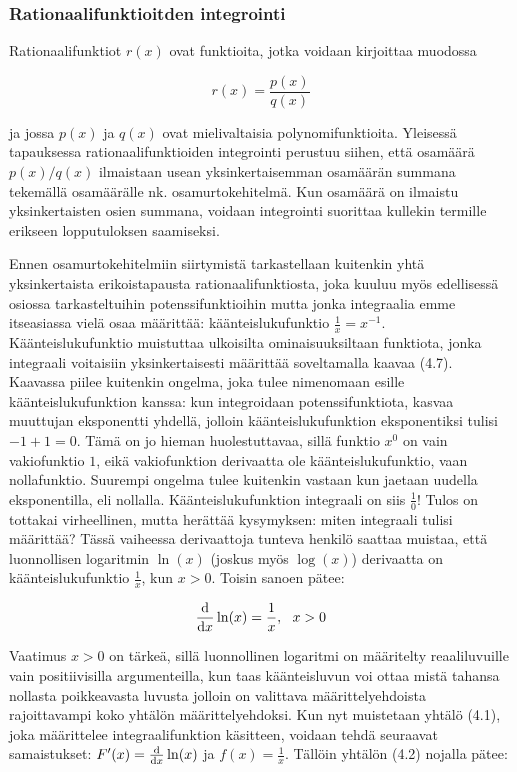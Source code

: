 \documentclass[../integrointiopas.tex]{subfiles}
\begin{document}
	
	
	\subsubsection{Rationaalifunktioitden integrointi}
	
	Rationaalifunktiot $r(x)$ ovat funktioita, jotka voidaan kirjoittaa muodossa
	
	\begin{equation}
		r(x) = \frac{p(x)}{q(x)}
	\end{equation}
	
	ja jossa $p(x)$ ja $q(x)$ ovat mielivaltaisia polynomifunktioita. Yleisessä tapauksessa rationaalifunktioiden integrointi perustuu siihen, että osamäärä $p(x)/q(x)$ ilmaistaan usean yksinkertaisemman osamäärän summana tekemällä osamäärälle nk. osamurtokehitelmä. Kun osamäärä on ilmaistu yksinkertaisten osien summana, voidaan integrointi suorittaa kullekin termille erikseen lopputuloksen saamiseksi. 
	
	Ennen osamurtokehitelmiin siirtymistä tarkastellaan kuitenkin yhtä yksinkertaista erikoistapausta rationaalifunktiosta, joka kuuluu myös edellisessä osiossa tarkasteltuihin potenssifunktioihin mutta jonka integraalia emme itseasiassa vielä osaa määrittää: käänteislukufunktio $\frac{1}{x} = x^{-1}$. Käänteislukufunktio muistuttaa ulkoisilta ominaisuuksiltaan funktiota, jonka integraali voitaisiin yksinkertaisesti määrittää soveltamalla kaavaa (4.7). Kaavassa piilee kuitenkin ongelma, joka tulee nimenomaan esille käänteislukufunktion kanssa: kun integroidaan potenssifunktiota, kasvaa muuttujan eksponentti yhdellä, jolloin käänteislukufunktion eksponentiksi tulisi $-1 + 1 = 0$. Tämä on jo hieman huolestuttavaa, sillä funktio $x^0$ on vain vakiofunktio $1$, eikä vakiofunktion derivaatta ole käänteislukufunktio, vaan nollafunktio. Suurempi ongelma tulee kuitenkin vastaan kun jaetaan uudella eksponentilla, eli nollalla. Käänteislukufunktion integraali on siis $\frac{1}{0}$! Tulos on tottakai virheellinen, mutta herättää kysymyksen: miten integraali tulisi määrittää? Tässä vaiheessa derivaattoja tunteva henkilö saattaa muistaa, että luonnollisen logaritmin $\ln(x)$ (joskus myös $\log(x)$) derivaatta on käänteislukufunktio $\frac{1}{x}$, kun $x > 0$. Toisin sanoen pätee:
	
	\begin{equation}
		\odv{}{x}\ln(x) = \frac{1}{x}, \ \ x > 0
	\end{equation}

	Vaatimus $x > 0$ on tärkeä, sillä luonnollinen logaritmi on määritelty reaaliluvuille vain positiivisilla argumenteilla, kun taas käänteisluvun voi ottaa mistä tahansa nollasta poikkeavasta luvusta jolloin on valittava määrittelyehdoista rajoittavampi koko yhtälön määrittelyehdoksi. Kun nyt muistetaan yhtälö (4.1), joka määrittelee integraalifunktion käsitteen, voidaan tehdä seuraavat samaistukset: $F'(x) = \odv{}{x}\ln(x)$ ja $f(x) = \frac{1}{x}$. Tällöin yhtälön (4.2) nojalla pätee:
	
\end{document}
